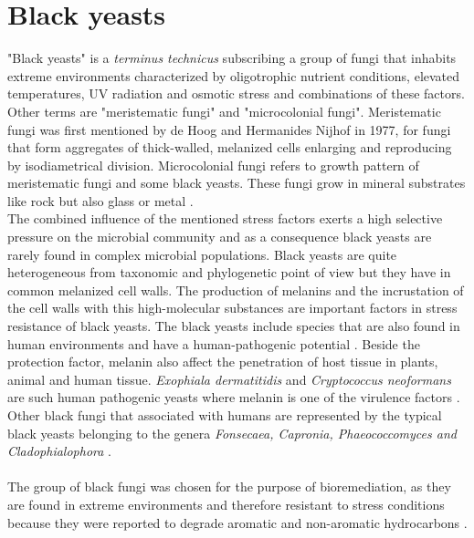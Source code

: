 \documentclass[12pt, a4paper]{report}
\begin{document}
\section{Black yeasts} 
"Black yeasts" is a \textit{terminus technicus} subscribing a group of fungi that inhabits extreme environments characterized by oligotrophic nutrient conditions, elevated temperatures, UV radiation and osmotic stress and combinations of these factors. Other terms are "meristematic fungi" and "microcolonial fungi".
Meristematic fungi was first mentioned by de Hoog and Hermanides Nijhof in 1977, for fungi that form aggregates of thick-walled, melanized cells enlarging and reproducing by isodiametrical division. Microcolonial fungi refers to growth pattern of meristematic fungi and some black yeasts. These fungi grow in mineral substrates like rock but also glass or metal \cite{Sterflinger2006}. \\
The combined influence of the mentioned stress factors exerts a high selective pressure on the microbial community and as a consequence black yeasts are rarely found in complex microbial populations. Black yeasts are quite heterogeneous from taxonomic and phylogenetic point of view but they have in common melanized cell walls. The production of melanins and the incrustation of the cell walls with this high-molecular substances are important factors in stress resistance of black yeasts. The black yeasts include species that are also found in human environments and have a human-pathogenic potential \cite{Sterflinger2006}. Beside the protection factor, melanin also affect the penetration of host tissue in plants, animal and human tissue. \textit{Exophiala dermatitidis} and \textit{Cryptococcus neoformans} are such human pathogenic yeasts where melanin is one of the virulence factors \cite{Hoog2003, Sterflinger2006}. Other black fungi that associated with humans are represented by the typical black yeasts belonging to the genera \textit{Fonsecaea, Capronia, Phaeococcomyces and Cladophialophora} \cite{Blasi2015}. \\
\ \\
The group of black fungi was chosen for the purpose of bioremediation, as they are found in extreme environments and therefore resistant to stress conditions because they were reported to degrade aromatic and non-aromatic hydrocarbons \cite{Poyntner2014} . 
\end{document}
